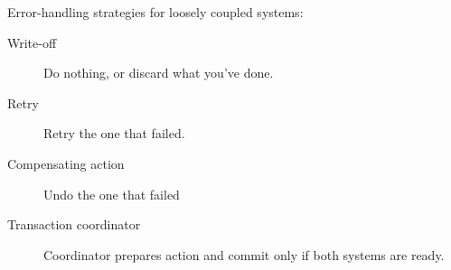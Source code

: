 Error-handling strategies for loosely coupled systems:

\begin{description}
\item[Write-off] Do nothing, or discard what you've done.

\item[Retry] Retry the one that failed.

\item[Compensating action] Undo the one that failed

\item[Transaction coordinator] Coordinator prepares action and commit only if both systems are ready.
\end{description}
